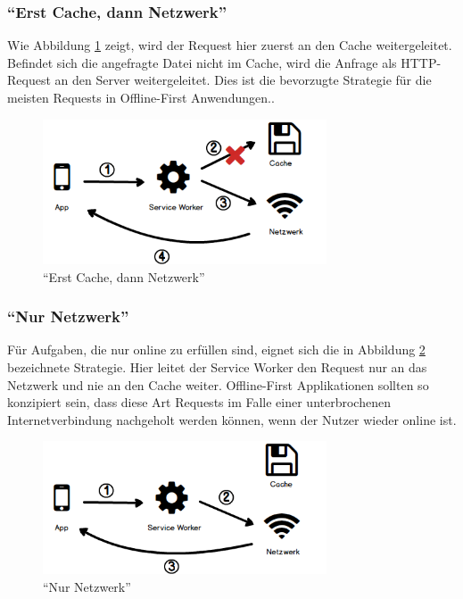 \documentclass[a4paper, 12pt]{scrreprt}
\begin{document}
\subsubsection{\enquote{Erst Cache, dann Netzwerk}}
Wie Abbildung \ref{fig:cachingCacheFirst} zeigt, wird der Request hier zuerst an den Cache weitergeleitet. Befindet sich die angefragte Datei nicht im Cache, wird die Anfrage als \ac{HTTP}-Request an den Server weitergeleitet. Dies ist die bevorzugte Strategie für die meisten Requests in Offline-First Anwendungen.\autocite[Kapitel 05]{BookBuildingPWAs}.

\begin{figure}[h]
	\centering
	\includegraphics[width=0.75\textwidth]{cachefirst.png}
	\caption{\enquote{Erst Cache, dann Netzwerk}}
	\label{fig:cachingCacheFirst}
\end{figure}

\subsubsection{\enquote{Nur Netzwerk}}
Für Aufgaben, die nur online zu erfüllen sind, eignet sich die in Abbildung \ref{fig:cachingNetworkOnly} bezeichnete Strategie. Hier leitet der Service Worker den Request nur an das Netzwerk und nie an den Cache weiter. Offline-First Applikationen sollten so konzipiert sein, dass diese Art Requests im Falle einer unterbrochenen Internetverbindung nachgeholt werden können, wenn der Nutzer wieder online ist.

\begin{figure}[h]
	\centering
	\includegraphics[width=0.75\textwidth]{networkonly.png}
	\caption{\enquote{Nur Netzwerk}}
	\label{fig:cachingNetworkOnly}
\end{figure}
\end{document}
